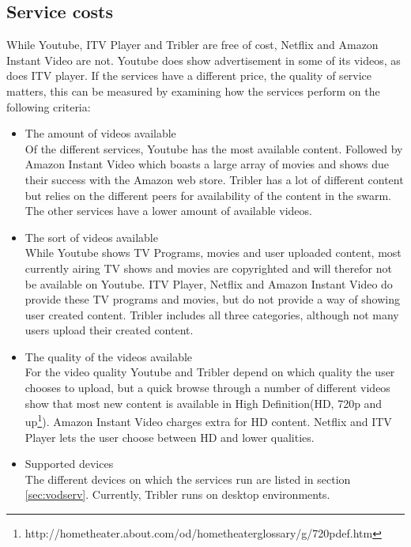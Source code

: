 {\subsection{Service costs}
While Youtube, ITV Player and Tribler are free of cost, Netflix and Amazon Instant Video are not. Youtube does show advertisement in some of its videos, as does ITV player. If the services have a different price, the quality of service matters, this can be measured by examining how the services perform on the following criteria:
\begin{itemize}
\item The amount of videos available\\
Of the different services, Youtube has the most available content. Followed by Amazon Instant Video which boasts a large array of movies and shows due their success with the Amazon web store. Tribler has a lot of different content but relies on the different peers for availability of the content in the swarm. The other services have a lower amount of available videos.
\item The sort of videos available\\
While Youtube shows TV Programs, movies and user uploaded content, most currently airing TV shows and movies are copyrighted and will therefor not be available on Youtube. ITV Player, Netflix and Amazon Instant Video do provide these TV programs and movies, but do not provide a way of showing user created content. Tribler includes all three categories, although not many users upload their created content.
\item The quality of the videos available\\
For the video quality Youtube and Tribler depend on which quality the user chooses to upload, but a quick browse through a number of different videos show that most new content is available in  High Definition(HD, 720p and up\footnote{http://hometheater.about.com/od/hometheaterglossary/g/720pdef.htm}). Amazon Instant Video charges extra for HD content. Netflix and ITV Player lets the user choose between HD and lower qualities.
\item Supported devices\\
The different devices on which the services run are listed in section \ref{sec:vodserv}. Currently, Tribler runs on desktop environments.
\end{itemize}
}
